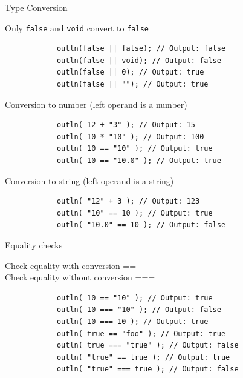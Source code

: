 \documentclass[ucs,9pt]{beamer}
\begin{document}
\begin{frame}[fragile]{Type Conversion}
	\begin{block}{Only \lstinline!false!  and \lstinline!void!  convert to \lstinline!false! }
		\begin{lstlisting}
			outln(false || false); // Output: false
			outln(false || void); // Output: false
			outln(false || 0); // Output: true
			outln(false || ""); // Output: true
		\end{lstlisting}
	\end{block}
	\pause
	\begin{block}{Conversion to number (left operand is a number)}
		\begin{lstlisting}
			outln( 12 + "3" ); // Output: 15
			outln( 10 * "10" ); // Output: 100
			outln( 10 == "10" ); // Output: true
			outln( 10 == "10.0" ); // Output: true
		\end{lstlisting}
	\end{block}
	\pause
	\begin{block}{Conversion to string (left operand is a string)}
		\begin{lstlisting}
			outln( "12" + 3 ); // Output: 123
			outln( "10" == 10 ); // Output: true
			outln( "10.0" == 10 ); // Output: false
		\end{lstlisting}
	\end{block}
\end{frame}

\begin{frame}[fragile]{Equality checks}
		\begin{block}{Check equality with conversion == \\
		Check equality without conversion === }
		\begin{lstlisting}
			outln( 10 == "10" ); // Output: true
			outln( 10 === "10" ); // Output: false
			outln( 10 === 10 ); // Output: true
			outln( true == "foo" ); // Output: true
			outln( true === "true" ); // Output: false
			outln( "true" == true ); // Output: true
			outln( "true" === true ); // Output: false
		\end{lstlisting}
	\end{block}
\end{frame}
\end{document}
